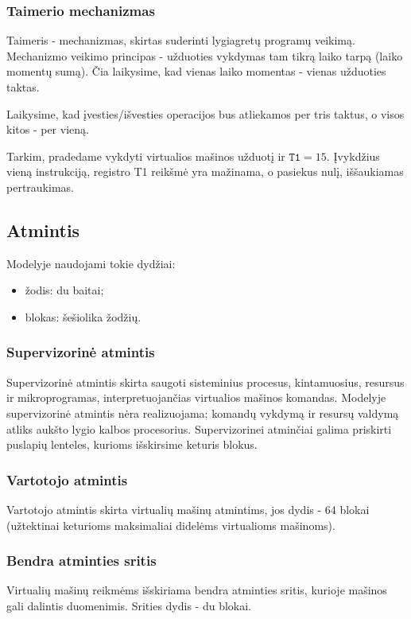 \documentclass{scrartcl}
\begin{document}
            \subsubsection{Taimerio mechanizmas}
                Taimeris - mechanizmas, skirtas suderinti lygiagretų programų veikimą. Mechanizmo veikimo principas - užduoties vykdymas tam tikrą laiko tarpą (laiko momentų sumą). Čia laikysime, kad vienas laiko momentas - vienas užduoties taktas.
                \par
                Laikysime, kad įvesties/išvesties operacijos bus atliekamos per tris taktus, o visos kitos - per vieną.
                \par
                Tarkim, pradedame vykdyti virtualios mašinos užduotį ir $\texttt{T1} = 15$. Įvykdžius vieną instrukciją, registro T1 reikšmė yra mažinama, o pasiekus nulį, iššaukiamas pertraukimas.
        \subsection{Atmintis}
            Modelyje naudojami tokie dydžiai:
            \begin{itemize}
                \item žodis: du baitai;
                \item blokas: šešiolika žodžių.
            \end{itemize}
            \subsubsection{Supervizorinė atmintis}
                Supervizorinė atmintis skirta saugoti sisteminius procesus, kintamuosius, resursus ir mikroprogramas, interpretuojančias virtualios mašinos komandas. Modelyje supervizorinė atmintis nėra realizuojama; komandų vykdymą ir resursų valdymą atliks aukšto lygio kalbos procesorius. Supervizorinei atminčiai galima priskirti puslapių lenteles, kurioms išskirsime keturis blokus.
            \subsubsection{Vartotojo atmintis}
                Vartotojo atmintis skirta virtualių mašinų atmintims, jos dydis - 64 blokai (užtektinai keturioms maksimaliai didelėms virtualioms mašinoms).
            \subsubsection{Bendra atminties sritis}
                Virtualių mašinų reikmėms išskiriama bendra atminties sritis, kurioje mašinos gali dalintis duomenimis. Srities dydis - du blokai.
\end{document}
